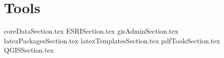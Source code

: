 \documentclass[class=report , crop=false, openany, titlepage, twoside, multi={itemize, figure, verbatim}, float=false]{standalone}
\title{}  %
\begin{document}
\ifstandalone
\maketitle %
\clearpage
\tableofcontents %
\clearpage
\fi

\chapter{Tools}
{coreDataSection.tex}
\clearpage
{ESRISection.tex}
\clearpage
{gisAdminSection.tex}
\clearpage
{latexPackagesSection.tex}
\clearpage
{latexTemplatesSection.tex}
\clearpage
{pdfToolsSection.tex}
\clearpage
{QGISSection.tex}
\end{document}
